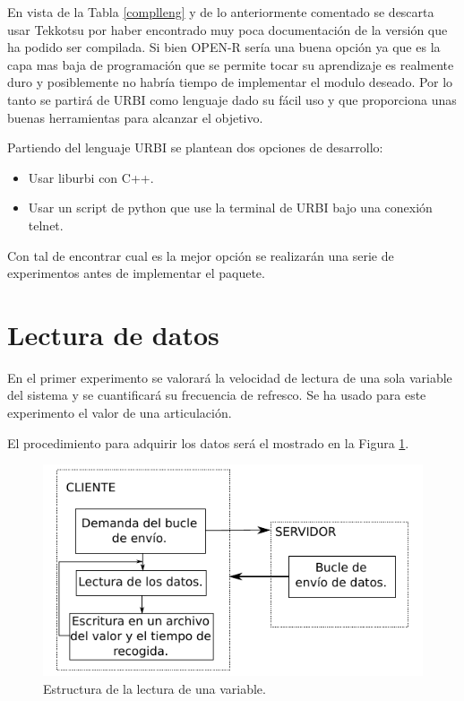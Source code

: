 \documentclass[12pt,a4paper,final,twoside]{book}
\begin{document}
En vista de la Tabla \ref{complleng} y de lo anteriormente comentado se descarta usar Tekkotsu por haber encontrado muy poca documentación de la versión que ha podido ser compilada. Si bien OPEN-R sería una buena opción ya que es la capa mas baja de programación que se permite tocar su aprendizaje es realmente duro y posiblemente no habría tiempo de implementar el modulo deseado. Por lo tanto se partirá de URBI como lenguaje dado su fácil uso y que proporciona unas buenas herramientas para alcanzar el objetivo.


Partiendo del lenguaje URBI se plantean dos opciones de desarrollo:
\begin{itemize}
\item Usar liburbi con C++.
\item Usar un script de python que use la terminal de URBI bajo una conexión telnet.
\end{itemize}

Con tal de encontrar cual es la mejor opción se realizarán una serie de experimentos antes de implementar el paquete. 

\section{Lectura de datos}\label{compenvio}
En el primer experimento se valorará la velocidad de lectura de una sola variable del sistema y se cuantificará su frecuencia de refresco. Se ha usado para este experimento el valor de una articulación.

El procedimiento para adquirir los datos será el mostrado en la Figura \ref{fig:readleg}.


\begin{figure}[h!]
	\centering
    \includegraphics[scale=1.4]{images/lectdata.pdf}
	 \caption{Estructura de la lectura de una variable.}
  \label{fig:readleg}
\end{figure}
\end{document}
